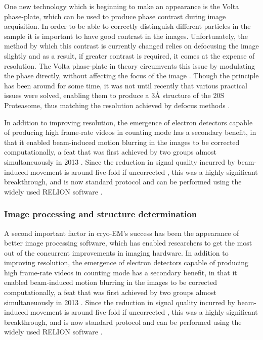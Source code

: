 \documentclass[a4paper,11pt,twoside,openright]{scrbook}
\begin{document}
One new technology which is beginning to make an appearance is the Volta phase-plate, which can be used to produce phase contrast during image acquisition. In order to be able to correctly distinguish different particles in the sample it is important to have good contrast in the images. Unfortunately, the method by which this contrast is currently changed relies on defocusing the image slightly and as a result, if greater contrast is required, it comes at the expense of resolution. The Volta phase-plate in theory circumvents this issue by modulating the phase directly, without affecting the focus of the image \cite{Danev2014}. Though the principle has been around for some time, it was not until recently that various practical issues were solved, enabling them to produce a 3Å structure of the 20S Proteasome, thus matching the resolution achieved by defocus methods \cite{Danev2016}.

In addition to improving resolution, the emergence of electron detectors capable of producing high frame-rate videos in counting mode has a secondary benefit, in that it enabled beam-induced motion blurring in the images to be corrected computationally, a feat that was first achieved by two groups almost simultaneuously in 2013 \cite{Bai2013, Li2013}. Since the reduction in signal quality incurred by beam-induced movement is around five-fold if uncorrected \cite{Henderson1985}, this was a highly significant breakthrough, and is now standard protocol and can be performed using the widely used RELION software \cite{Scheres2012,Scheres2014}.

\subsubsection{Image processing and structure determination}
A second important factor in cryo-EM's success has been the appearance of better image processing software, which has enabled researchers to get the most out of the concurrent improvements in imaging hardware. In addition to improving resolution, the emergence of electron detectors capable of producing high frame-rate videos in counting mode has a secondary benefit, in that it enabled beam-induced motion blurring in the images to be corrected computationally, a feat that was first achieved by two groups almost simultaneuously in 2013 \cite{Bai2013, Li2013}. Since the reduction in signal quality incurred by beam-induced movement is around five-fold if uncorrected \cite{Henderson1985}, this was a highly significant breakthrough, and is now standard protocol and can be performed using the widely used RELION software \cite{Scheres2012,Scheres2014}.
\end{document}
